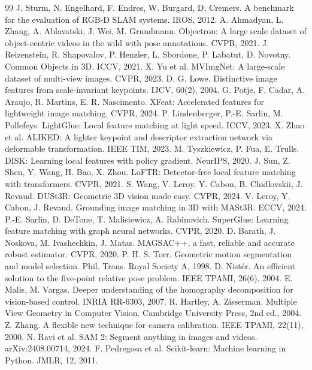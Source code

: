 \documentclass[11pt,a4paper]{article}
\begin{document}
\begin{thebibliography}{99}\small
{} J. Sturm, N. Engelhard, F. Endres, W. Burgard, D. Cremers. A benchmark for the evaluation of RGB-D SLAM systems. IROS, 2012.
 A. Ahmadyan, L. Zhang, A. Ablavatski, J. Wei, M. Grundmann. Objectron: A large scale dataset of object-centric videos in the wild with pose annotations. CVPR, 2021.
 J. Reizenstein, R. Shapovalov, P. Henzler, L. Sbordone, P. Labatut, D. Novotny. Common Objects in 3D. ICCV, 2021.
 X. Yu et al. MVImgNet: A large-scale dataset of multi-view images. CVPR, 2023.
 D. G. Lowe. Distinctive image features from scale-invariant keypoints. IJCV, 60(2), 2004.
 G. Potje, F. Cadar, A. Araujo, R. Martins, E. R. Nascimento. XFeat: Accelerated features for lightweight image matching. CVPR, 2024.
 P. Lindenberger, P.-E. Sarlin, M. Pollefeys. LightGlue: Local feature matching at light speed. ICCV, 2023.
 X. Zhao et al. ALIKED: A lighter keypoint and descriptor extraction network via deformable transformation. IEEE TIM, 2023.
 M. Tyszkiewicz, P. Fua, E. Trulls. DISK: Learning local features with policy gradient. NeurIPS, 2020.
 J. Sun, Z. Shen, Y. Wang, H. Bao, X. Zhou. LoFTR: Detector-free local feature matching with transformers. CVPR, 2021.
 S. Wang, V. Leroy, Y. Cabon, B. Chidlovskii, J. Revaud. DUSt3R: Geometric 3D vision made easy. CVPR, 2024.
 V. Leroy, Y. Cabon, J. Revaud. Grounding image matching in 3D with MASt3R. ECCV, 2024.
 P.-E. Sarlin, D. DeTone, T. Malisiewicz, A. Rabinovich. SuperGlue: Learning feature matching with graph neural networks. CVPR, 2020.
 D. Barath, J. Noskova, M. Ivashechkin, J. Matas. MAGSAC++, a fast, reliable and accurate robust estimator. CVPR, 2020.
 P. H. S. Torr. Geometric motion segmentation and model selection. Phil. Trans. Royal Society A, 1998.
 D. Nist\'er. An efficient solution to the five-point relative pose problem. IEEE TPAMI, 26(6), 2004.
 E. Malis, M. Vargas. Deeper understanding of the homography decomposition for vision-based control. INRIA RR-6303, 2007.
 R. Hartley, A. Zisserman. Multiple View Geometry in Computer Vision. Cambridge University Press, 2nd ed., 2004.
 Z. Zhang. A flexible new technique for camera calibration. IEEE TPAMI, 22(11), 2000.
 N. Ravi et al. SAM 2: Segment anything in images and videos. arXiv:2408.00714, 2024.
 F. Pedregosa et al. Scikit-learn: Machine learning in Python. JMLR, 12, 2011.
\end{thebibliography}
\end{document}
